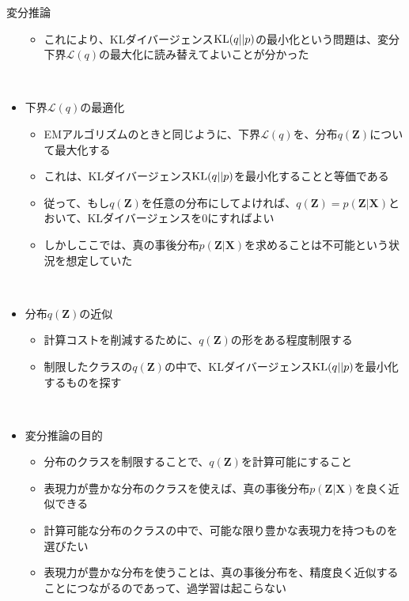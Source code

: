 \documentclass[dvipdfmx,notheorems,t]{beamer}
\begin{document}
\begin{frame}{変分推論}
\begin{itemize}
\begin{itemize}
		\item これにより、KLダイバージェンス$\operatorname{KL}(q || p)$の最小化という問題は、変分下界$\mathcal{L}(q)$の最大化に読み替えてよいことが分かった
	\end{itemize} \
	
	\framebreak
	
	\item 下界$\mathcal{L}(q)$の最適化
	\begin{itemize}
		\item EMアルゴリズムのときと同じように、下界$\mathcal{L}(q)$を、分布$q(\bm{Z})$について最大化する
		\item これは、KLダイバージェンス$\operatorname{KL} (q || p)$を最小化することと等価である
		\newline
		\item 従って、\color{red}もし$q(\bm{Z})$を任意の分布にしてよければ\normalcolor 、$q(\bm{Z}) = p(\bm{Z} | \bm{X})$とおいて、KLダイバージェンスを$0$にすればよい
		\newline
		\item しかしここでは、\color{red}真の事後分布$p(\bm{Z} | \bm{X})$を求めることは不可能\normalcolor という状況を想定していた
	\end{itemize} \
	
	\item 分布$q(\bm{Z})$の近似
	\begin{itemize}
		\item 計算コストを削減するために、$q(\bm{Z})$の形をある程度\alert{制限する}
		\item 制限したクラスの$q(\bm{Z})$の中で、KLダイバージェンス$\operatorname{KL} (q || p)$を最小化するものを探す
	\end{itemize} \
	
	\item 変分推論の目的
	\begin{itemize}
		\item 分布のクラスを制限することで、$q(\bm{Z})$を計算可能にすること
		\item 表現力が豊かな分布のクラスを使えば、真の事後分布$p(\bm{Z} | \bm{X})$を良く近似できる
		\newline
		\item 計算可能な分布のクラスの中で、\alert{可能な限り豊かな表現力を持つ}ものを選びたい
		\item 表現力が豊かな分布を使うことは、真の事後分布を、精度良く近似することにつながるのであって、\alert{過学習は起こらない}
	\end{itemize}
\end{itemize}

\end{frame}
\end{document}
